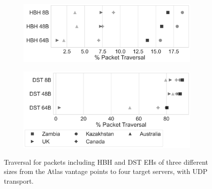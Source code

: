 \documentclass[conference]{IEEEtran}
\begin{document}
\begin{figure}[htbp]
    \centering
    
    \begin{subfigure}[b]{0.45\textwidth}
        \includegraphics[width=\textwidth]{hbh-size-comparison.png}
        \label{subfig:a}
    \end{subfigure}
    \hfill
    \begin{subfigure}[b]{0.45\textwidth}
        \includegraphics[width=\textwidth]{dst-size-comparison.png}
        \label{subfig:b}
    \end{subfigure}
    
    \caption{Traversal for packets including HBH and DST EHs of three different sizes from the Atlas vantage points to four target servers, with UDP transport.}
    \label{fig:main-size}
\end{figure}
\end{document}
